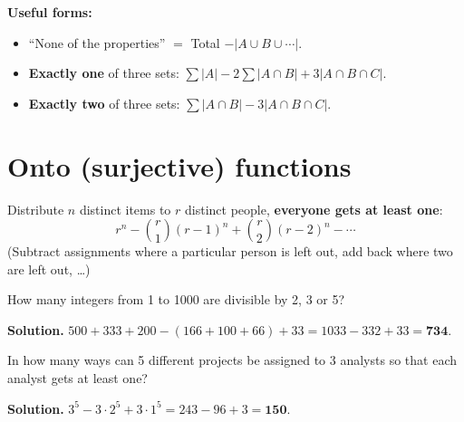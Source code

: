 \documentclass[11pt,a4paper,openany]{report}
\newcommand{\C}[2]{\binom{#1}{#2}}
\begin{document}
\textbf{Useful forms:}
\begin{itemize}[nosep]
\item ``None of the properties'' $=$ Total $-|A\cup B\cup\cdots|$.
\item \textbf{Exactly one} of three sets: $\sum|A|-2\sum|A\cap B|+3|A\cap B\cap C|$.
\item \textbf{Exactly two} of three sets: $\sum|A\cap B|-3|A\cap B\cap C|$.
\end{itemize}
\begin{center}
\end{center}

\section{Onto (surjective) functions}
Distribute $n$ distinct items to $r$ distinct people, \textbf{everyone gets at least one}:
\[r^n-\C r1(r-1)^n+\C r2(r-2)^n-\cdots\]
(Subtract assignments where a particular person is left out, add back where two are left out, \dots)

\begin{example}
How many integers from 1 to 1000 are divisible by 2, 3 or 5?

\textbf{Solution.} $500+333+200-(166+100+66)+33=1033-332+33=\mathbf{734}$.
\end{example}

\begin{example}
In how many ways can 5 different projects be assigned to 3 analysts so that each analyst gets at least one?

\textbf{Solution.} $3^5-3\cdot2^5+3\cdot1^5=243-96+3=\mathbf{150}$.
\end{example}
\end{document}
